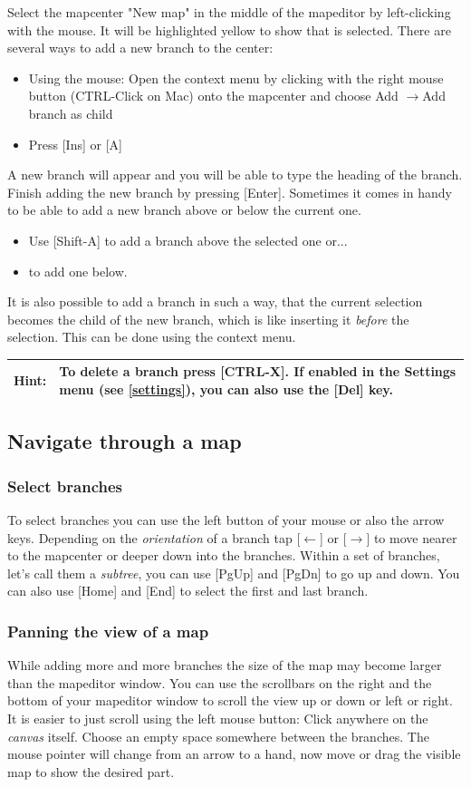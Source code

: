 \documentclass[12pt,a4paper]{article}
\newcommand{\hint}[1]{
	\begin{center} 
		\begin{tabular}{|rp{12cm}|} \hline
			{\bf Hint}:& #1\\	\hline
		\end{tabular}
			\marginpar{\Huge !} 
	\end{center} 
}
\newcommand{\ra}{$\longrightarrow$}
\newcommand{\la}{$\longleftarrow$}
\newcommand{\key}[1]{[#1]}
\begin{document}
Select the mapcenter "New map" in the middle of the mapeditor by
left-clicking with the mouse. It will be highlighted yellow to show that is
selected. There are several ways to add a new branch to the center:
\begin{itemize}
	\item Using the mouse: Open the context menu by clicking with the
	right mouse button (CTRL-Click on Mac) onto the
	mapcenter and choose Add \ra Add branch as child
	\item Press \key{Ins} or \key{A}
\end{itemize}
A new branch will appear and you will be able to type the heading of the
branch. Finish adding the new branch by pressing \key{Enter}.
Sometimes it comes in handy to be able to add a new branch above or below the current
one. 
\begin{itemize}
	\item Use \key{Shift-A} to add a branch above the selected one or... 
	\item \key{Ctrl-A} to add one below. 
\end{itemize}
It is also
possible to add a branch in such a way, that the current selection
becomes the child of the new branch, which is like inserting it {\em
before} the selection. This can be done using the context menu.

\hint{To delete a branch press \key{CTRL-X}. If enabled in the Settings
menu (see \ref{settings}), you can also use the \key{Del} key.}

\subsection{Navigate through a map}
\subsubsection*{Select branches}
To select branches you can use the left button of your mouse or also the
arrow keys. Depending on the {\em orientation} of a branch tap
\key{\la} or \key{\ra} to move nearer to the mapcenter or deeper
down into the branches. Within a set of branches, let's call them a 
{\em subtree}, you can use \key{PgUp} and \key{PgDn} to go up and down. You can
also use \key{Home} and \key{End} to select the first and last branch.


\subsubsection*{Panning the view of a map}
While adding more and more branches the size of the map may become
larger than the mapeditor window. You can use the scrollbars on the
right and the bottom of your mapeditor window to scroll the view up or down or left or right. It is easier to just scroll using the left mouse button: Click anywhere on the {\em canvas} itself. Choose an empty space somewhere between the branches. The
mouse pointer will change from an arrow to a hand, now move or drag the visible
map to show the desired part.
\end{document}
